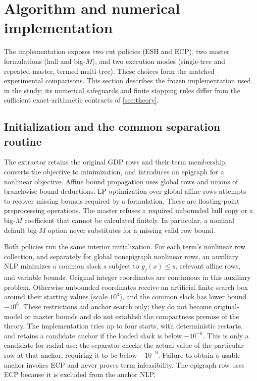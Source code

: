 \section{Algorithm and numerical implementation}\label{sec:algorithm}
The implementation exposes two cut policies (ESH and ECP), two master formulations (hull and big-$M$), and two execution modes (single-tree and repeated-master, termed multi-tree). These choices form the matched experimental comparisons. This section describes the frozen implementation used in the study; its numerical safeguards and finite stopping rules differ from the sufficient exact-arithmetic contracts of \cref{sec:theory}.

\subsection{Initialization and the common separation routine}
The extractor retains the original GDP rows and their term membership, converts the objective to minimization, and introduces an epigraph for a nonlinear objective. Affine bound propagation uses global rows and unions of branchwise bound deductions. LP optimization over global affine rows attempts to recover missing bounds required by a formulation. These are floating-point preprocessing operations. The master refuses a required unbounded hull copy or a big-$M$ coefficient that cannot be calculated finitely. In particular, a nominal default big-$M$ option never substitutes for a missing valid row bound.

Both policies run the same interior initialization. For each term's nonlinear row collection, and separately for global nonepigraph nonlinear rows, an auxiliary NLP minimizes a common slack $s$ subject to $g_j(x)\le s$, relevant affine rows, and variable bounds. Original integer coordinates are continuous in this auxiliary problem. Otherwise unbounded coordinates receive an artificial finite search box around their starting values (scale $10^3$), and the common slack has lower bound $-10^6$. These restrictions aid anchor search only; they do not become original-model or master bounds and do not establish the compactness premise of the theory. The implementation tries up to four starts, with deterministic restarts, and retains a candidate anchor if the loaded slack is below $-10^{-6}$. This is only a candidate for radial use: the separator checks the actual value of the particular row at that anchor, requiring it to be below $-10^{-9}$. Failure to obtain a usable anchor invokes ECP and never proves term infeasibility. The epigraph row uses ECP because it is excluded from the anchor NLP.

